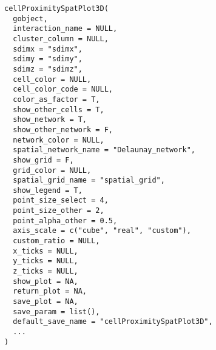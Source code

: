 \documentclass[a4paper]{book}
\begin{document}
\begin{Usage}
\begin{verbatim}
cellProximitySpatPlot3D(
  gobject,
  interaction_name = NULL,
  cluster_column = NULL,
  sdimx = "sdimx",
  sdimy = "sdimy",
  sdimz = "sdimz",
  cell_color = NULL,
  cell_color_code = NULL,
  color_as_factor = T,
  show_other_cells = T,
  show_network = T,
  show_other_network = F,
  network_color = NULL,
  spatial_network_name = "Delaunay_network",
  show_grid = F,
  grid_color = NULL,
  spatial_grid_name = "spatial_grid",
  show_legend = T,
  point_size_select = 4,
  point_size_other = 2,
  point_alpha_other = 0.5,
  axis_scale = c("cube", "real", "custom"),
  custom_ratio = NULL,
  x_ticks = NULL,
  y_ticks = NULL,
  z_ticks = NULL,
  show_plot = NA,
  return_plot = NA,
  save_plot = NA,
  save_param = list(),
  default_save_name = "cellProximitySpatPlot3D",
  ...
)
\end{verbatim}
\end{Usage}
%
\end{document}
